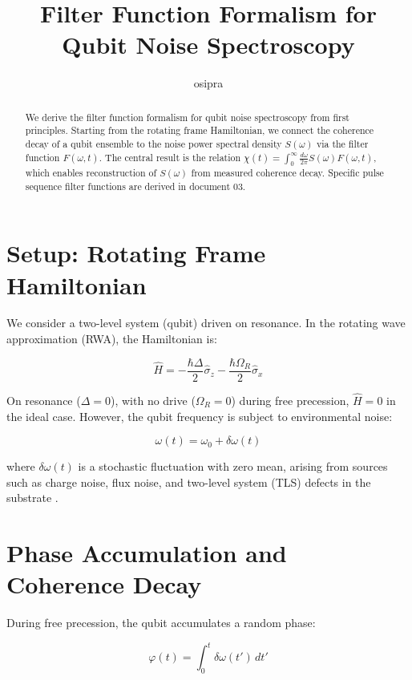 \documentclass[12pt]{article}
\title{Filter Function Formalism for Qubit Noise Spectroscopy}
\author{osipra}
\date{}
\begin{document}
\maketitle

\begin{abstract}
We derive the filter function formalism for qubit noise spectroscopy from first principles. Starting from the rotating frame Hamiltonian, we connect the coherence decay of a qubit ensemble to the noise power spectral density $S(\omega)$ via the filter function $F(\omega, t)$. The central result is the relation $\chi(t) = \int_0^\infty \frac{d\omega}{2\pi} S(\omega) F(\omega, t)$, which enables reconstruction of $S(\omega)$ from measured coherence decay. Specific pulse sequence filter functions are derived in document 03.
\end{abstract}

\section{Setup: Rotating Frame Hamiltonian}

We consider a two-level system (qubit) driven on resonance. In the rotating wave approximation (RWA), the Hamiltonian is:

\begin{equation}
    \hat{H} = -\frac{\hbar \Delta}{2}\hat{\sigma}_z - \frac{\hbar \Omega_R}{2}\hat{\sigma}_x
\end{equation}

On resonance ($\Delta = 0$), with no drive ($\Omega_R = 0$) during free precession, $\hat{H} = 0$ in the ideal case. However, the qubit frequency is subject to environmental noise:

\begin{equation}
    \omega(t) = \omega_0 + \delta\omega(t)
\end{equation}

where $\delta\omega(t)$ is a stochastic fluctuation with zero mean, arising from sources such as charge noise, flux noise, and two-level system (TLS) defects in the substrate \cite{Clerk2010}.

\section{Phase Accumulation and Coherence Decay}

During free precession, the qubit accumulates a random phase:

\begin{equation}
    \varphi(t) = \int_0^t \delta\omega(t')\, dt'
\end{equation}
\end{document}
